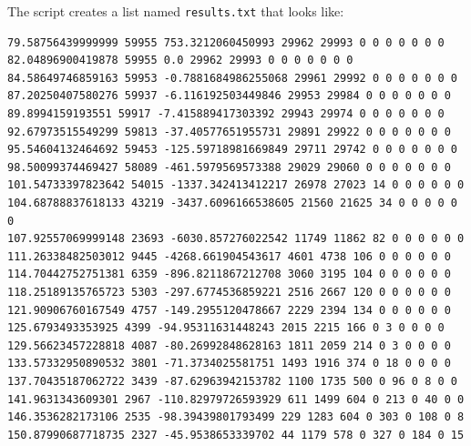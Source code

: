 The script creates a list named {\tt results.txt} that looks like:
\begin{verbatim}
79.58756439999999 59955 753.3212060450993 29962 29993 0 0 0 0 0 0 0
82.04896900419878 59955 0.0 29962 29993 0 0 0 0 0 0 0
84.58649746859163 59953 -0.7881684986255068 29961 29992 0 0 0 0 0 0 0
87.20250407580276 59937 -6.116192503449846 29953 29984 0 0 0 0 0 0 0
89.8994159193551 59917 -7.415889417303392 29943 29974 0 0 0 0 0 0 0
92.67973515549299 59813 -37.40577651955731 29891 29922 0 0 0 0 0 0 0
95.54604132464692 59453 -125.59718981669849 29711 29742 0 0 0 0 0 0 0
98.50099374469427 58089 -461.5979569573388 29029 29060 0 0 0 0 0 0 0
101.54733397823642 54015 -1337.342413412217 26978 27023 14 0 0 0 0 0 0
104.68788837618133 43219 -3437.6096166538605 21560 21625 34 0 0 0 0 0 0
107.92557069999148 23693 -6030.857276022542 11749 11862 82 0 0 0 0 0 0
111.26338482503012 9445 -4268.661904543617 4601 4738 106 0 0 0 0 0 0
114.70442752751381 6359 -896.8211867212708 3060 3195 104 0 0 0 0 0 0
118.25189135765723 5303 -297.6774536859221 2516 2667 120 0 0 0 0 0 0
121.90906760167549 4757 -149.2955120478667 2229 2394 134 0 0 0 0 0 0
125.6793493353925 4399 -94.95311631448243 2015 2215 166 0 3 0 0 0 0
129.56623457228818 4087 -80.26992848628163 1811 2059 214 0 3 0 0 0 0
133.57332950890532 3801 -71.3734025581751 1493 1916 374 0 18 0 0 0 0
137.70435187062722 3439 -87.62963942153782 1100 1735 500 0 96 0 8 0 0
141.9631343609301 2967 -110.82979726593929 611 1499 604 0 213 0 40 0 0
146.3536282173106 2535 -98.39439801793499 229 1283 604 0 303 0 108 0 8
150.87990687718735 2327 -45.9538653339702 44 1179 578 0 327 0 184 0 15
\end{verbatim}

